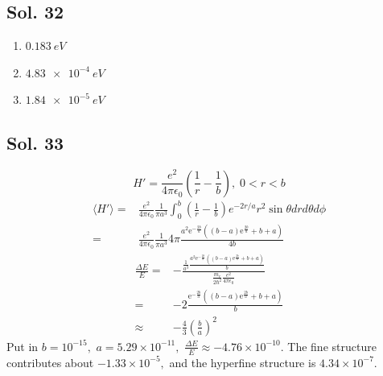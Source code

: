 \subsection*{Sol. 32}
\begin{enumerate}
    \item $\qty{0.183}{eV}$
    \item $\qty{4.83e-4}{eV}$
    \item $\qty{1.84e-5}{eV}$
\end{enumerate}

\subsection*{Sol. 33}
$$
H'= \frac{e^2}{4\pi\epsilon_0}(\frac{1}{r}-\frac{1}{b}), \; 0<r<b
$$
\begin{align*}
    \langle H'\rangle
    =&\frac{e^2}{4\pi\epsilon_0}
    \frac{1}{\pi a^3}\int_0^b (\frac{1}{r}- \frac{1}{b})e^{-2r/a} r^2\sin\theta drd\theta d\phi\\
    =&
    \frac{e^2}{4\pi\epsilon_0}
    \frac{1}{\pi a^3}4\pi\frac{a^{2} \mathrm{e}^{-\frac{2b}{a}} \left(\left(b - a\right) \mathrm{e}^{\frac{2b}{a}} + b + a\right)}{4b}
\end{align*}
\begin{align*}
    \frac{\Delta E}{E}
    =&- \frac{ 
    \frac{1}{ a^3}\frac{a^{2} \mathrm{e}^{-\frac{2b}{a}} \left(\left(b - a\right) \mathrm{e}^{\frac{2b}{a}} + b + a\right)}{b}}
    {\frac{m_e}{2\hbar^2}\frac{e^2}{4\pi\epsilon_0}}\\
    =&-2\frac{ \mathrm{e}^{-\frac{2b}{a}} \left(\left(b - a\right) \mathrm{e}^{\frac{2b}{a}} + b + a\right)}{b}\\
    \approx &  -\frac{4}{3}(\frac{b}{a})^2
\end{align*}
Put in $b=10^{-15},$ $a=5.29\times 10^{-11},$ 
$\frac{\Delta E}{E}\approx -4.76\times 10^{-10}.$ The fine structure contributes about $-1.33\times 10^{-5},$ and the hyperfine structure is $4.34\times 10^{-7}.$

